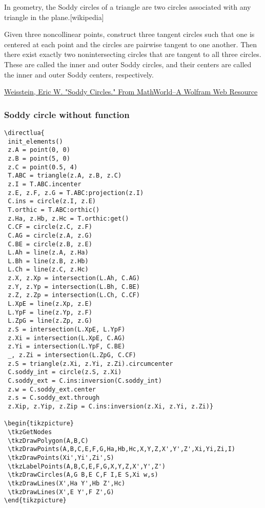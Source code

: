 In geometry, the Soddy circles of a triangle are two circles associated with any triangle in the plane.[wikipedia]

 Given three noncollinear points, construct three tangent circles such that one is centered at each point and the circles are pairwise tangent to one another. Then there exist exactly two nonintersecting circles that are tangent to all three circles. These are called the inner and outer Soddy circles, and their centers are called the inner and outer Soddy centers, respectively.
\begin{flushright}
\small
 \href{https://mathworld.wolfram.com/SoddyCircles.html}{ Weisstein, Eric W. "Soddy Circles." From MathWorld--A Wolfram Web Resource}
 \end{flushright}


\subsubsection{Soddy circle without function}

\begin{verbatim}
\directlua{
 init_elements()
 z.A = point(0, 0)
 z.B = point(5, 0)
 z.C = point(0.5, 4)
 T.ABC = triangle(z.A, z.B, z.C)
 z.I = T.ABC.incenter
 z.E, z.F, z.G = T.ABC:projection(z.I)
 C.ins = circle(z.I, z.E)
 T.orthic = T.ABC:orthic()
 z.Ha, z.Hb, z.Hc = T.orthic:get()
 C.CF = circle(z.C, z.F)
 C.AG = circle(z.A, z.G)
 C.BE = circle(z.B, z.E)
 L.Ah = line(z.A, z.Ha)
 L.Bh = line(z.B, z.Hb)
 L.Ch = line(z.C, z.Hc)
 z.X, z.Xp = intersection(L.Ah, C.AG)
 z.Y, z.Yp = intersection(L.Bh, C.BE)
 z.Z, z.Zp = intersection(L.Ch, C.CF)
 L.XpE = line(z.Xp, z.E)
 L.YpF = line(z.Yp, z.F)
 L.ZpG = line(z.Zp, z.G)
 z.S = intersection(L.XpE, L.YpF)
 z.Xi = intersection(L.XpE, C.AG)
 z.Yi = intersection(L.YpF, C.BE)
 _, z.Zi = intersection(L.ZpG, C.CF)
 z.S = triangle(z.Xi, z.Yi, z.Zi).circumcenter
 C.soddy_int = circle(z.S, z.Xi)
 C.soddy_ext = C.ins:inversion(C.soddy_int)
 z.w = C.soddy_ext.center
 z.s = C.soddy_ext.through
 z.Xip, z.Yip, z.Zip = C.ins:inversion(z.Xi, z.Yi, z.Zi)}

\begin{tikzpicture}
 \tkzGetNodes
 \tkzDrawPolygon(A,B,C)
 \tkzDrawPoints(A,B,C,E,F,G,Ha,Hb,Hc,X,Y,Z,X',Y',Z',Xi,Yi,Zi,I)
 \tkzDrawPoints(Xi',Yi',Zi',S)
 \tkzLabelPoints(A,B,C,E,F,G,X,Y,Z,X',Y',Z')
 \tkzDrawCircles(A,G B,E C,F I,E S,Xi w,s)
 \tkzDrawLines(X',Ha Y',Hb Z',Hc)
 \tkzDrawLines(X',E Y',F Z',G)
\end{tikzpicture}
\end{verbatim}

